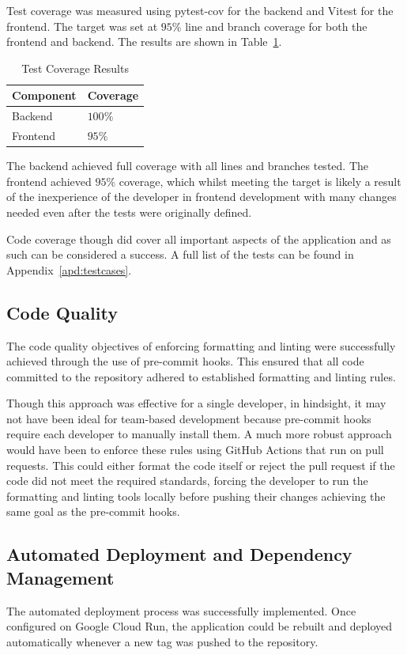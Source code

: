 Test coverage was measured using pytest-cov for the backend and Vitest for the frontend. The target was set at $95\%$ line and branch coverage for both the frontend and backend. The results are shown in Table~\ref{tab:test-coverage-results}.
\begin{table} [H]
    \centering
    \begin{tabular}{|m{3cm}|m{3cm}|}
        \hline
        \textbf{Component} & \textbf{Coverage} \\
        \hline
        Backend & $100\%$ \\
        \hline
        Frontend & $95\%$ \\
        \hline
    \end{tabular}
    \caption{Test Coverage Results}
    \label{tab:test-coverage-results}
\end{table}

The backend achieved full coverage with all lines and branches tested. The frontend achieved $95\%$ coverage, which whilst meeting the target is likely a result of the inexperience of the developer in frontend development with many changes needed even after the tests were originally defined.

Code coverage though did cover all important aspects of the application and as such can be considered a success.
\ifshowappendix
A full list of the tests can be found in Appendix~\ref{apd:testcases}.
\fi

\subsection{Code Quality}
The code quality objectives of enforcing formatting and linting were successfully achieved through the use of pre-commit hooks. This ensured that all code committed to the repository adhered to established formatting and linting rules.

Though this approach was effective for a single developer, in hindsight, it may not have been ideal for team-based development because pre-commit hooks require each developer to manually install them. A much more robust approach would have been to enforce these rules using GitHub Actions that run on pull requests. This could either format the code itself or reject the pull request if the code did not meet the required standards, forcing the developer to run the formatting and linting tools locally before pushing their changes achieving the same goal as the pre-commit hooks.

\subsection{Automated Deployment and Dependency Management}
The automated deployment process was successfully implemented. Once configured on Google Cloud Run, the application could be rebuilt and deployed automatically whenever a new tag was pushed to the repository.

